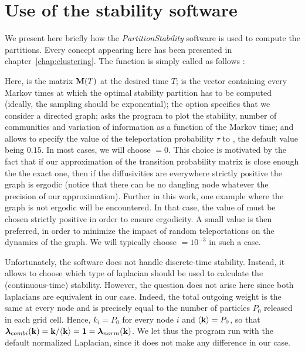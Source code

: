 \section{Use of the stability software}
We present here briefly how the \textit{PartitionStability} software is used to compute the partitions. Every concept appearing here has been presented in chapter~\ref{chap:clustering}. The  function is simply called as follows : \vspace{-.2cm}
\begin{center}
\end{center} %
Here,  is the matrix $\mathbf M(T)$ at the desired time $T$;  is the vector containing every Markov times at which the optimal stability partition has to be computed (ideally, the sampling should be exponential); the  option specifies that we consider a directed graph;  asks the program to plot the stability, number of communities and variation of information as a function of the Markov time; and  allows to specify the value of the teleportation probability $\tau$ to , the default value being $0.15$. In most cases, we will choose  $= 0$. This choice is motivated by the fact that if our approximation of the transition probability matrix is close enough the the exact one, then if the diffusivities are everywhere strictly positive the graph is ergodic (notice that there can be no dangling node whatever the precision of our approximation). Further in this work, one example where the graph is not ergodic will be encountered. In that case, the value of  must be chosen strictly positive in order to ensure ergodicity. A small value is then preferred, in order to minimize the impact of random teleportations on the dynamics of the graph. We will typically choose  $=10^{-3}$ in such a case.

Unfortunately, the software does not handle discrete-time stability. Instead, it allows to choose which type of laplacian should be used to calculate the (continuous-time) stability. However, the question does not arise here since both laplacians are equivalent in our case. Indeed, the total outgoing weight is the same at every node and is precisely equal to the number of particles $P_0$ released in each grid cell. Hence, $k_i = P_0$ for every node $i$ and $\langle \mathbf k \rangle = P_0$, so that $\boldsymbol \lambda_{combi}(\mathbf k) = \mathbf k/ \langle \mathbf k \rangle = \mathbf 1 = \boldsymbol \lambda_{norm}(\mathbf k)$. We let thus the program run with the default normalized Laplacian, since it does not make any difference in our case.

